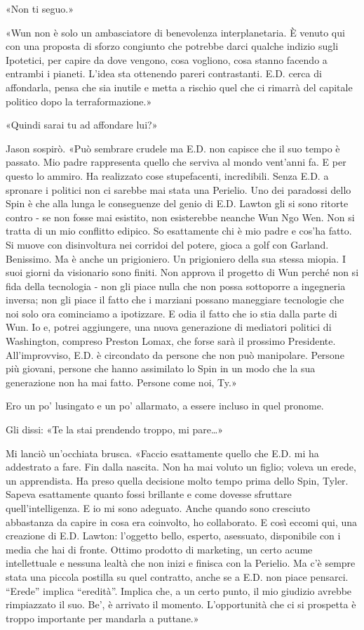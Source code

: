 «Non ti seguo.»

«Wun non è solo un ambasciatore di benevolenza interplanetaria. È venuto
qui con una proposta di sforzo congiunto che potrebbe darci qualche
indizio sugli Ipotetici, per capire da dove vengono, cosa vogliono, cosa
stanno facendo a entrambi i pianeti. L'idea sta ottenendo pareri
contrastanti. E.D. cerca di affondarla, pensa che sia inutile e metta a
rischio quel che ci rimarrà del capitale politico dopo la
terraformazione.»

«Quindi sarai tu ad affondare lui?»

Jason sospirò. «Può sembrare crudele ma E.D. non capisce che il suo
tempo è passato. Mio padre rappresenta quello che serviva al mondo
vent'anni fa. E per questo lo ammiro. Ha realizzato cose stupefacenti,
incredibili. Senza E.D. a spronare i politici non ci sarebbe mai stata
una Perielio. Uno dei paradossi dello Spin è che alla lunga le
conseguenze del genio di E.D. Lawton gli si sono ritorte contro - se non
fosse mai esistito, non esisterebbe neanche Wun Ngo Wen. Non si tratta
di un mio conflitto edipico. So esattamente chi è mio padre e cos'ha
fatto. Si muove con disinvoltura nei corridoi del potere, gioca a golf
con Garland. Benissimo. Ma è anche un prigioniero. Un prigioniero della
sua stessa miopia. I suoi giorni da visionario sono finiti. Non approva
il progetto di Wun perché non si fida della tecnologia - non gli piace
nulla che non possa sottoporre a ingegneria inversa; non gli piace il
fatto che i marziani possano maneggiare tecnologie che noi solo ora
cominciamo a ipotizzare. E odia il fatto che io stia dalla parte di Wun.
Io e, potrei aggiungere, una nuova generazione di mediatori politici di
Washington, compreso Preston Lomax, che forse sarà il prossimo
Presidente. All'improvviso, E.D. è circondato da persone che non può
manipolare. Persone più giovani, persone che hanno assimilato lo Spin in
un modo che la sua generazione non ha mai fatto. Persone come noi, Ty.»

Ero un po' lusingato e un po' allarmato, a essere incluso in quel
pronome.

Gli dissi: «Te la stai prendendo troppo, mi pare\ldots»

Mi lanciò un'occhiata brusca. «Faccio esattamente quello che E.D. mi ha
addestrato a fare. Fin dalla nascita. Non ha mai voluto un figlio;
voleva un erede, un apprendista. Ha preso quella decisione molto tempo
prima dello Spin, Tyler. Sapeva esattamente quanto fossi brillante e
come dovesse sfruttare quell'intelligenza. E io mi sono adeguato. Anche
quando sono cresciuto abbastanza da capire in cosa era coinvolto, ho
collaborato. E così eccomi qui, una creazione di E.D. Lawton: l'oggetto
bello, esperto, asessuato, disponibile con i media che hai di fronte.
Ottimo prodotto di marketing, un certo acume intellettuale e nessuna
lealtà che non inizi e finisca con la Perielio. Ma c'è sempre stata una
piccola postilla su quel contratto, anche se a E.D. non piace pensarci.
``Erede'' implica ``eredità''. Implica che, a un certo punto, il mio
giudizio avrebbe rimpiazzato il suo. Be', è arrivato il momento.
L'opportunità che ci si prospetta è troppo importante per mandarla a
puttane.»

